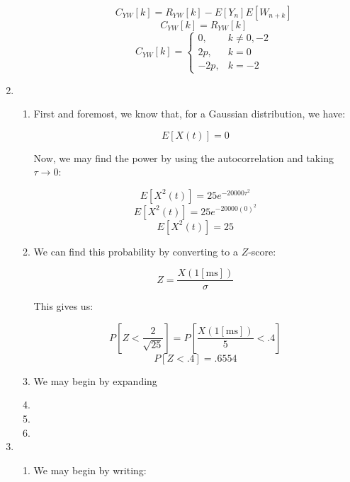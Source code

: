 \begin{enumerate}
\begin{enumerate}
\begin{enumerate}
            $$C_{YW}[k]=R_{YW}[k]-E[Y_n]E[W_{n+k}]$$
            $$C_{YW}[k]=R_{YW}[k]$$
            $$\boxed{C_{YW}[k]=\left\{\begin{array}{ll} 0, & k\neq0,-2\\ 2p, & k=0\\-2p, & k=-2\end{array}}$$

        \end{enumerate}

    \end{enumerate}

  \item

    \begin{enumerate}

      \item First and foremost, we know that, for a Gaussian distribution, we have:

        $$\boxed{E[X(t)]=0}$$

        Now, we may find the power by using the autocorrelation and taking $\tau\to0$:

        $$E[X^2(t)]=25e^{-20000\tau^2}$$
        $$E[X^2(t)]=25e^{-20000(0)^2}$$
        $$\boxed{E[X^2(t)]=25}$$

      \item We can find this probability by converting to a $Z$-score:

        $$Z=\frac{X(1[\si{\milli\second}])}{\sigma}$$

        This gives us:

        $$P\left[ Z<\frac{2}{\sqrt{25}} \right]=P\left[\frac{X(1[\si{\milli\second}])}{5}<.4\right]$$
        $$\boxed{P\left[ Z<.4 \right]=.6554}$$

      \item We may begin by expanding 

      \item 

      \item 

      \item 

    \end{enumerate}

  \item

    \begin{enumerate}

      \item We may begin by writing:


\end{enumerate}
\end{enumerate}
